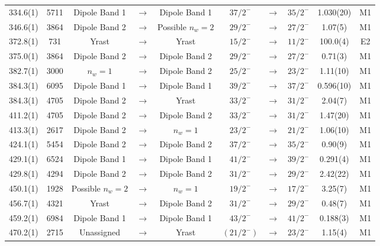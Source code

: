 \begin{landscape}
\begin{center}
\begin{longtable}{|c|c|ccc|ccc|c|c|}
 334.6(1) & 5711 & Dipole Band 1 & $ \rightarrow $ & Dipole Band 1 & $ 37/2^{-} $ & $ \rightarrow $ & $ 35/2^{-} $ & 1.030(20) & M1 \\
 346.6(1) & 3864 & Dipole Band 2 & $ \rightarrow $ & Possible $n_w=2$ & $ 29/2^{-} $ & $ \rightarrow $ & $ 27/2^{-} $ & 1.07(5) & M1 \\
 372.8(1) & 731 & Yrast & $ \rightarrow $ & Yrast & $ 15/2^{-} $ & $ \rightarrow $ & $ 11/2^{-} $ & 100.0(4) & E2 \\
 375.0(1) & 3864 & Dipole Band 2 & $ \rightarrow $ & Dipole Band 2 & $ 29/2^{-} $ & $ \rightarrow $ & $ 27/2^{-} $ & 0.71(3) & M1 \\
 382.7(1) & 3000 & $n_w=1$ & $ \rightarrow $ & Dipole Band 2 & $ 25/2^{-} $ & $ \rightarrow $ & $ 23/2^{-} $ & 1.11(10) & M1 \\
 384.3(1) & 6095 & Dipole Band 1 & $ \rightarrow $ & Dipole Band 1 & $ 39/2^{-} $ & $ \rightarrow $ & $ 37/2^{-} $ & 0.596(10) & M1 \\
 384.3(1) & 4705 & Dipole Band 2 & $ \rightarrow $ & Yrast & $ 33/2^{-} $ & $ \rightarrow $ & $ 31/2^{-} $ & 2.04(7) & M1 \\
 411.2(1) & 4705 & Dipole Band 2 & $ \rightarrow $ & Dipole Band 2 & $ 33/2^{-} $ & $ \rightarrow $ & $ 31/2^{-} $ & 1.47(20) & M1 \\
 413.3(1) & 2617 & Dipole Band 2 & $ \rightarrow $ & $n_w=1$ & $ 23/2^{-} $ & $ \rightarrow $ & $ 21/2^{-} $ & 1.06(10) & M1 \\
 424.1(1) & 5454 & Dipole Band 2 & $ \rightarrow $ & Dipole Band 2 & $ 37/2^{-} $ & $ \rightarrow $ & $ 35/2^{-} $ & 0.90(9) & M1 \\
 429.1(1) & 6524 & Dipole Band 1 & $ \rightarrow $ & Dipole Band 1 & $ 41/2^{-} $ & $ \rightarrow $ & $ 39/2^{-} $ & 0.291(4) & M1 \\
 429.8(1) & 4294 & Dipole Band 2 & $ \rightarrow $ & Dipole Band 2 & $ 31/2^{-} $ & $ \rightarrow $ & $ 29/2^{-} $ & 2.42(22) & M1 \\
 450.1(1) & 1928 & Possible $n_w=2$ & $ \rightarrow $ & $n_w=1$ & $ 19/2^{-} $ & $ \rightarrow $ & $ 17/2^{-} $ & 3.25(7) & M1 \\
 456.7(1) & 4321 & Yrast & $ \rightarrow $ & Dipole Band 2 & $ 31/2^{-} $ & $ \rightarrow $ & $ 29/2^{-} $ & 0.48(7) & M1 \\
 459.2(1) & 6984 & Dipole Band 1 & $ \rightarrow $ & Dipole Band 1 & $ 43/2^{-} $ & $ \rightarrow $ & $ 41/2^{-} $ & 0.188(3) & M1 \\
 470.2(1) & 2715 & Unassigned & $ \rightarrow $ & Yrast & $ (21/2^{-}) $ & $ \rightarrow $ & $ 23/2^{-} $ & 1.15(4) & M1 \\

\end{longtable}
\end{center}
\end{landscape}
